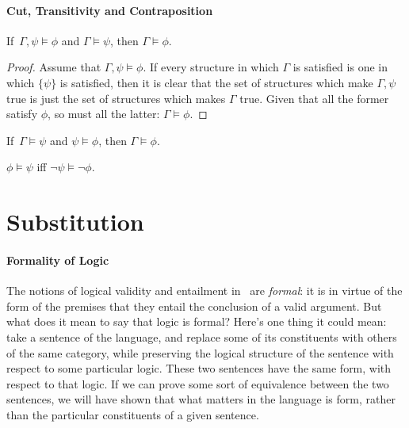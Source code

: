 \paragraph{Cut, Transitivity and Contraposition} 

\begin{theorem}[Cut] \label{semanticcut} If\, $\Gamma, \psi \vDash \phi$ and $\Gamma \vDash \psi$, then $\Gamma \vDash \phi$. \begin{proof}
	Assume that $\Gamma, \psi \vDash \phi$. If every structure in which $\Gamma$ is satisfied is one in which $\{\psi\}$ is satisfied, then it is clear that the set of structures
	which make $\Gamma, \psi$ true is just the set of structures which makes 
	$\Gamma$ true. Given that all the former satisfy $\phi$, so must all the latter: $\Gamma \vDash \phi$.
\end{proof}
\end{theorem}
\begin{theorem}[Transitivity]
	If\, $\Gamma \vDash \psi$ and $\psi \vDash \phi$, then $\Gamma \vDash \phi$.
\end{theorem}

\begin{theorem}[Contraposition]
$\phi \vDash \psi$ iff $\neg \psi \vDash \neg \phi$.
	
\end{theorem}




\section{Substitution}

\paragraph{Formality of Logic} The notions of logical validity and entailment in \lone\ are \emph{formal}: it is in virtue of the form of the premises that they entail the conclusion of a valid argument. But what does it mean to say that logic is formal? Here's one thing it could mean: take a sentence of the language, and replace some of its constituents with others of the same category, while preserving the logical structure of the sentence with respect to some particular logic. These two sentences have the same form, with respect to that logic. If we can prove some sort of equivalence between the two sentences, we will have shown that what matters in the language is form, rather than the particular constituents of a given sentence. 

